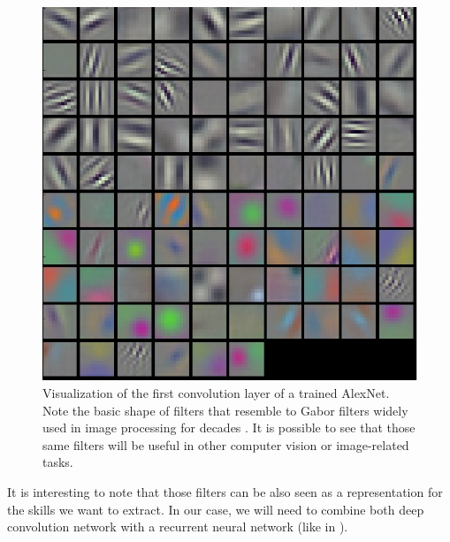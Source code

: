     \begin{figure}[!htbp]
      \centering
      \includegraphics[scale=0.4]{images/sota/filt1.jpeg}
      \caption[Convolution Neural Networks filters shape]{Visualization of the first convolution layer of a trained AlexNet. Note the basic shape of filters that resemble to Gabor filters widely used in image processing for decades \citep{fogel1989gabor,jain1991unsupervised}. It is possible to see that those same filters will be useful in other computer vision or image-related tasks.}
      \label{fig:AlexNet_filters}
    \end{figure}

    \par It is interesting to note that those filters can be also seen as a representation for the skills we want to extract. In our case, we will need to combine both deep convolution network with a recurrent neural network (like in \citep{s16010115,pinheiro2014recurrent,huang2016deep}).



